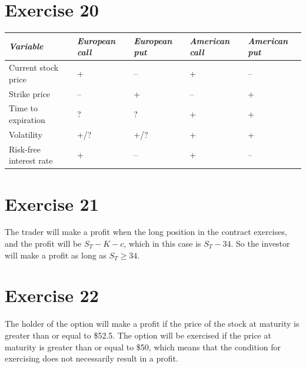 \documentclass{article}
\begin{document}
\section*{Exercise 20}
\begin{tabular}{|l|l|l|l|l|}\hline
    {\em Variable} & {\em European call} & {\em European put} & {\em American call} &
    {\em American put}\\\hline
    Current stock price & + & – & + & – \\\hline
    Strike price & – & + & – & + \\\hline
    Time to expiration & ?&?&+&+\\\hline
    Volatility &+/?&+/?&+&+\\\hline
    Risk-free interest rate &+&–&+&–\\\hline
\end{tabular}

\section*{Exercise 21}

The trader will make a profit when the long position in the contract exercises, and the profit will be
$S_T - K - c$, which in this case is $S_T - 34$. So the investor will make a profit as long as $S_T \geq 34$.

\section*{Exercise 22}
The holder of the option will make a profit if the price of the stock at maturity is greater than or equal to
\$52.5. The option will be exercised if the price at maturity is greater than or equal to \$50, which means that
the condition for exercising does not necessarily result in a profit.

\begin{center}
\end{center}
\end{document}
